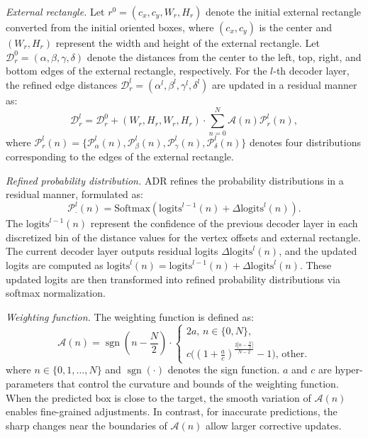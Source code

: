\documentclass[lettersize,journal]{IEEEtran}
\begin{document}
\textit{External rectangle.} Let $r^0 = (c_x, c_y, W_r, H_r)$ denote the initial external rectangle converted from the initial oriented boxes, where $(c_x, c_y)$ is the center and $(W_r, H_r)$ represent the width and height of the external rectangle. Let $\mathcal{D}_r^0 = (\alpha,\beta,\gamma,\delta)$ denote the distances from the center to the left, top, right, and bottom edges of the external rectangle, respectively. 
For the $l$-th decoder layer, the refined edge distances $\mathcal{D}_r^l = (\alpha^l, \beta^l, \gamma^l, \delta^l)$ are updated in a residual manner as:
\begin{equation}
\mathcal{D}_r^l = \mathcal{D}_r^0 + (W_r, H_r, W_r, H_r) \cdot \sum_{n=0}^{N} \mathcal{A}(n)\mathcal{P}_r^{l}(n), 
\end{equation}
where $\mathcal{P}_r^l(n)=\{\mathcal{P}_\alpha^l(n),\mathcal{P}_\beta^l(n),\mathcal{P}_\gamma^l(n),\mathcal{P}_\delta^l(n)\}$ denotes four distributions corresponding to the edges of the external rectangle.

\charmferDistance



\textit{Refined probability distribution.}
ADR refines the probability distributions in a residual manner, formulated as:
\begin{equation}
\mathcal{P}^l_\cdot(n)=\text{Softmax}(\text{logits}^{l-1}(n) + \Delta \text{logits}^l(n)).
\end{equation}
The $\text{logits}^{l-1}(n)$ represent the confidence of the previous decoder layer in each discretized bin of the distance values for the vertex offsets and external rectangle.
The current decoder layer outputs residual logits $\Delta \text{logits}^l(n)$, and the updated logits are computed as $\text{logits}^l(n)=\text{logits}^{l-1}(n)+\Delta \text{logits}^l(n)$.
These updated logits are then transformed into refined probability distributions via softmax normalization.


\textit{Weighting function.}
The weighting function is defined as:
\begin{equation}\label{weight_fun}
\mathcal{A}(n) = \operatorname{sgn}(n-\frac{N}{2})\cdot 
\begin{cases} 
2a, \, n\in\{0,N\},\\
c\Big((1+\frac{a}{c})^{\frac{2\left| n-\frac{N}{2} \right|}{N-2}}-1\Big), \, \text{other}.
\end{cases} 
\end{equation}
where $n\in\{0,1,\dots,N\}$ and $\operatorname{sgn}(\cdot)$ denotes the sign function. 
$a$ and $c$ are hyper-parameters that control the curvature and bounds of the weighting function. 
When the predicted box is close to the target, the smooth variation of $\mathcal{A}(n)$ enables fine-grained adjustments. 
In contrast, for inaccurate predictions, the sharp changes near the boundaries of $\mathcal{A}(n)$ allow larger corrective updates.
\end{document}
